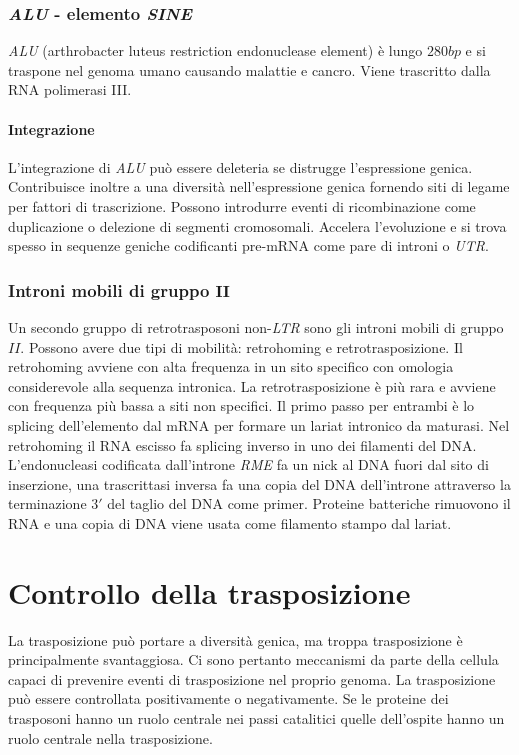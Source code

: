 		\subsubsection{\emph{ALU} - elemento \emph{SINE}}
		\emph{ALU} (arthrobacter luteus restriction endonuclease element) \`e lungo $280bp$ e si traspone nel genoma umano causando malattie e cancro.
		Viene trascritto dalla RNA polimerasi III.
		
			\paragraph{Integrazione}
			L'integrazione di \emph{ALU} pu\`o essere deleteria se distrugge l'espressione genica.
			Contribuisce inoltre a una diversit\`a nell'espressione genica fornendo siti di legame per fattori di trascrizione.
			Possono introdurre eventi di ricombinazione come duplicazione o delezione di segmenti cromosomali.
			Accelera l'evoluzione e si trova spesso in sequenze geniche codificanti pre-mRNA come pare di introni o \emph{UTR}.

		\subsubsection{Introni mobili di gruppo $\mathbf{II}$}
		Un secondo gruppo di retrotrasposoni non-\emph{LTR} sono gli introni mobili di gruppo $II$.
		Possono avere due tipi di mobilit\`a: retrohoming e retrotrasposizione.
		Il retrohoming avviene con alta frequenza in un sito specifico con omologia considerevole alla sequenza intronica.
		La retrotrasposizione \`e pi\`u rara e avviene con frequenza pi\`u bassa a siti non specifici.
		Il primo passo per entrambi \`e lo splicing dell'elemento dal mRNA per formare un lariat intronico da maturasi. 
		Nel retrohoming il RNA escisso fa splicing inverso in uno dei filamenti del DNA.
		L'endonucleasi codificata dall'introne \emph{RME} fa un nick al DNA fuori dal sito di inserzione, una trascrittasi inversa fa una copia del DNA dell'introne attraverso la terminazione $3'$ del taglio del DNA come primer.
		Proteine batteriche rimuovono il RNA e una copia di DNA viene usata come filamento stampo dal lariat.


\section{Controllo della trasposizione}
La trasposizione pu\`o portare a diversit\`a genica, ma troppa trasposizione \`e principalmente svantaggiosa.
Ci sono pertanto meccanismi da parte della cellula capaci di prevenire eventi di trasposizione nel proprio genoma.
La trasposizione pu\`o essere controllata positivamente o negativamente.
Se le proteine dei trasposoni hanno un ruolo centrale nei passi catalitici quelle dell'ospite hanno un ruolo centrale nella trasposizione.

